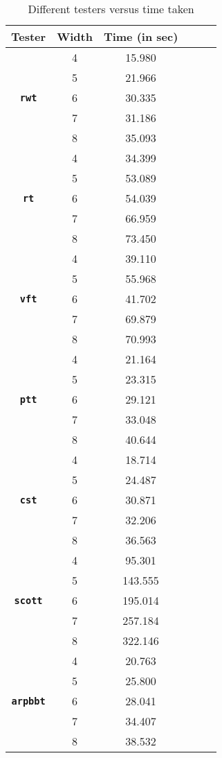 \begin{table}[h]
    
    \caption{Different testers versus time taken}
  \label{tab:time_profile}
  \centering
  \begin{tabular}{cccccc}
  \\
    \toprule
    \textbf{Tester} & \textbf{Width} & \textbf{Time (in sec)} \\
    \midrule
    & 4 & 15.980\\
    & 5 & 21.966\\
    \textbf{\texttt{rwt}}& 6 & 30.335\\
    & 7 & 31.186\\
    & 8 & 35.093\\
    \midrule
    & 4 & 34.399\\
    & 5 & 53.089\\
    \textbf{\texttt{rt}}& 6 & 54.039\\
    & 7 & 66.959\\
    & 8 & 73.450\\
    \midrule
    & 4 & 39.110\\
    & 5 & 55.968\\
    \textbf{\texttt{vft}}& 6 & 41.702\\
    & 7 & 69.879\\
    & 8 & 70.993\\
    \midrule
    & 4 & 21.164\\
    & 5 & 23.315\\
    \textbf{\texttt{ptt}}& 6 & 29.121\\
    & 7 & 33.048\\
    & 8 & 40.644\\
    \midrule
    & 4 & 18.714\\
    & 5 & 24.487\\
    \textbf{\texttt{cst}}& 6 & 30.871\\
    & 7 & 32.206\\
    & 8 & 36.563\\
    \midrule
    & 4 & 95.301\\
    & 5 & 143.555\\
    \textbf{\texttt{scott}}& 6 & 195.014\\
    & 7 & 257.184\\
    & 8 & 322.146\\
    \midrule
    & 4 & 20.763\\
    & 5 & 25.800\\
    \textbf{\texttt{arpbbt}}& 6 & 28.041\\
    & 7 & 34.407\\
    & 8 & 38.532\\
\bottomrule
    \end{tabular}
\end{table}

